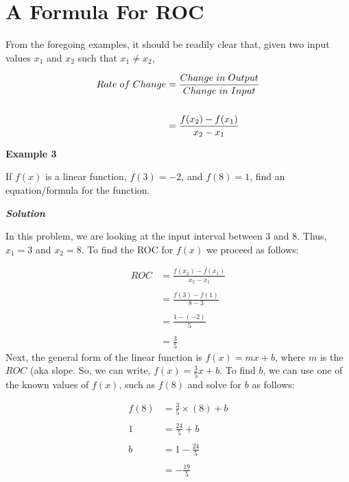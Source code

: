 \documentclass[
  letterpaper,
  DIV=11,
  numbers=noendperiod]{scrreprt}
\begin{document}
\hypertarget{a-formula-for-roc}{%
\section{A Formula For ROC}\label{a-formula-for-roc}}

From the foregoing examples, it should be readily clear that, given two
input values \(x_1\) and \(x_2\) such that \(x_1\neq x_2\),

\[
\begin{aligned}
  Rate \hspace{0.04in}of\hspace{0.04in} Change                         
  &=\frac{Change\hspace{0.04in}in\hspace{0.04in}Output}{Change \hspace{0.04in}         
  in\hspace{0.04in}Input}\\ \\
  &=\frac{f(x_2)-f(x_1)}{x_2 - x_1}
  \end{aligned}
\]

\textbf{Example 3}

If \(f(x)\) is a linear function, \(f(3)=−2\), and \(f(8)=1\), find an
equation/formula for the function.

\textbf{\emph{Solution}}

In this problem, we are looking at the input interval between 3 and 8.
Thus, \(x_1=3\) and \(x_2=8\). To find the ROC for \(f(x)\) we proceed
as follows:

\begin{align}
ROC &= \frac{f(x_2)-f(x_1)}{x_2 - x_1}\\\\
&= \frac{f(3)-f(1)}{8 - 3}\\\\
&= \frac{1-(-2)}{5}\\\\
&=\frac{3}{5}
\end{align} Next, the general form of the linear function is
\(f(x)=mx+b\), where \(m\) is the \(ROC\) (aka slope. So, we can write,
\(f(x)=\frac{3}{5}x+b\). To find \(b\), we can use one of the known
values of \(f(x)\), such as \(f(8)\) and solve for \(b\) as follows:

\[
\begin{aligned}
f(8)&=\frac{3}{5}\times (8)+b\\\\
1&=\frac{24}{5}+b\\ \\
b&=1-\frac{24}{5}\\ \\
&=-\frac{19}{5}
\end{aligned}
\]
\end{document}
